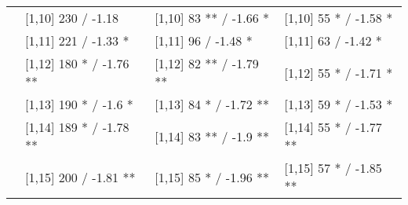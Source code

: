 \begin{table}
\begin{tabular}[t]{llll}
 & {}[1,10] 230  / -1.18 & {}[1,10] 83 ** / -1.66 * & {}[1,10] 55 * / -1.58 *\\
 & {}[1,11] 221  / -1.33 * & {}[1,11] 96  / -1.48 * & {}[1,11] 63  / -1.42 *\\
 & {}[1,12] 180 * / -1.76 ** & {}[1,12] 82 ** / -1.79 ** & {}[1,12] 55 * / -1.71 *\\
\addlinespace
 & {}[1,13] 190 * / -1.6 * & {}[1,13] 84 * / -1.72 ** & {}[1,13] 59 * / -1.53 *\\
 & {}[1,14] 189 * / -1.78 ** & {}[1,14] 83 ** / -1.9 ** & {}[1,14] 55 * / -1.77 **\\
 & {}[1,15] 200  / -1.81 ** & {}[1,15] 85 * / -1.96 ** & {}[1,15] 57 * / -1.85 **\\
\bottomrule
\end{tabular}
\end{table}

